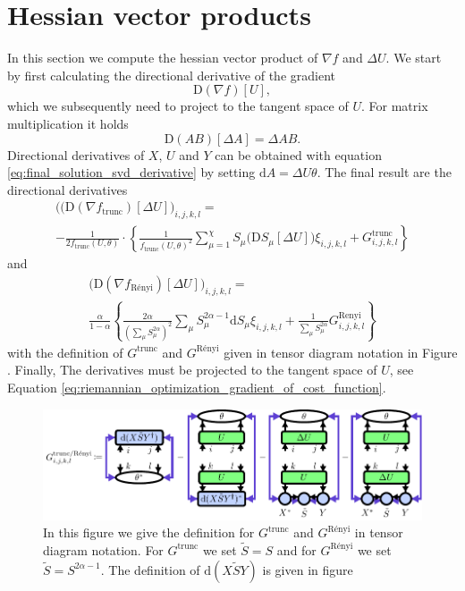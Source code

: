 \section{Hessian vector products}
\label{sec:renyi_trunc_hvps}
%
%
In this section we compute the hessian vector product of $\nabla f$ and $\Delta U$. We start by first calculating the directional derivative of the gradient
\begin{equation}
	\text{D}\left(\nabla f\right)\left[U\right],
\end{equation}
which we subsequently need to project to the tangent space of $U$. For matrix multiplication it holds\cite{cite:the_matrix_cook_book}
\begin{equation}
	\text{D}\left(AB\right)\left[\Delta A\right] = \Delta AB.
\end{equation}
Directional derivatives of $X$, $U$ and $Y$ can be obtained with equation \eqref{eq:final_solution_svd_derivative} by setting $\text{d}A = \Delta U\theta$. The final result are the directional derivatives
\begin{multline}
	\big((\text{D}(\nabla f_\text{trunc})[\Delta U]\big)_{i,j,k,l} = \\
	-\frac{1}{2f_\text{trunc}(U, \theta)} \cdot \left\{\frac{1}{f_\text{trunc}(U,\theta)^2}\sum_{\mu=1}^{\chi}S_\mu\big(\text{D}S_\mu[\Delta U]\big)\xi_{i,j,k,l} + G^\text{trunc}_{i,j,k,l}\right\}
\end{multline}
and
\begin{multline}	
	\big(\text{D}(\nabla f_\text{Rényi})[\Delta U]\big)_{i,j,k,l} = \\
	\frac{\alpha}{1-\alpha} \left\{\frac{2\alpha}{\left(\sum_\mu S_\mu^{2\alpha}\right)^2}\sum_\mu S_\mu^{2\alpha-1}\text{d}S_\mu\xi_{i,j,k,l} + \frac{1}{\sum_\mu S_\mu^{2\alpha}}G^\text{Renyi}_{i,j,k,l}\right\}
\end{multline}
with the definition of $G^\text{trunc}$ and $G^\text{Rényi}$ given in tensor diagram notation in Figure . Finally, The derivatives must be projected to the tangent space of $U$, see Equation \eqref{eq:riemannian_optimization_gradient_of_cost_function}.
\begin{figure}
	\centering
	\includegraphics[scale=0.9]{figures/tikz/gradient_and_hvp/G_definition/G_definition.pdf}
	\caption{In this figure we give the definition for $G^\text{trunc}$ and $G^\text{Rényi}$ in tensor diagram notation. For $G^\text{trunc}$ we set  $\tilde{S} = S$ and for $G^\text{Rényi}$ we set  $\tilde{S} = S^{2\alpha-1}$. The definition of $\text{d}(X\tilde{S}Y)$ is given in figure \protect{}}
	\label{fig:G_definition}
\end{figure}

